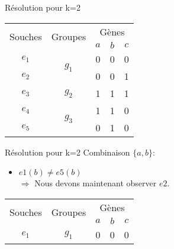 \begin{overprint}
{\begin{minipage}[r]{0.46\linewidth}
\begin{block}{Résolution pour k=2}
\begin{itemize}
					\end{itemize}
				\end{block}
			\end{minipage}
		}
		{
			\begin{minipage}[l]{0.46\linewidth}
				\begin{center}
					\begin{tabular}{|c||c|c|c|c|}
						\hline
						\multirow{2}{*}{Souches}&\multirow{2}{*}{Groupes}&\multicolumn{3}{c|}{Gènes
						}\\
						&&\cellcolor{blue!75}$a$&\cellcolor{blue!75}$b$&$c$\\
						\hline
						\hline
						$e_1$&\multirow{2}{*}{$g_1$}& 0 & \cellcolor{cyan}0 & 0\\
						\cline{1-1} \cline{3-5}
						$e_2$&& 0 & 0 & 1\\
						\hline
						\hline
						$e_3$&$g_2$& 1 & 1 & 1\\
						\hline
						\hline
						$e_4$&\multirow{2}{*}{$g_3$}& 1 & 1 & 0\\
						\cline{1-1} \cline{3-5}
						$e_5$&& 0 & \cellcolor{cyan}1 & 0\\
						\hline
					\end{tabular}
				\end{center}
			\end{minipage}
			\hspace{0.6cm}
			\begin{minipage}[r]{0.46\linewidth}
				\begin{block}{Résolution pour k=2}
					Combinaison $\{a,b\}$:
					\begin{itemize}
						\item $e1(b) \not = e5(b) $ \\ $\Rightarrow$ Nous devons maintenant observer $e2$.
					\end{itemize}
				\end{block}
			\end{minipage}
		}
		\only<12>
		{
			\begin{minipage}[l]{0.46\linewidth}
				\begin{center}
					\begin{tabular}{|c||c|c|c|c|}
						\hline
						\multirow{2}{*}{Souches}&\multirow{2}{*}{Groupes}&\multicolumn{3}{c|}{Gènes
						}\\
						&&\cellcolor{blue!75}$a$&\cellcolor{blue!75}$b$&$c$\\
						\hline
						\hline
						$e_1$&\multirow{2}{*}{$g_1$}& 0 & 0 & 0\\

\end{tabular}
\end{center}
\end{minipage}}
\end{overprint}
